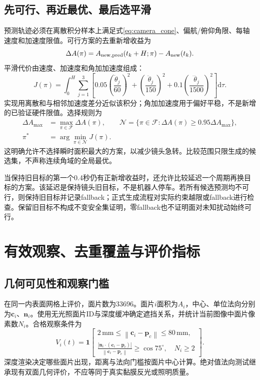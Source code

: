 \documentclass[UTF8,a4paper,zihao=5,fontset=windows]{ctexart}
\newcommand{\vect}[1]{\bm{#1}}
\newcommand{\norm}[1]{\left\lVert#1\right\rVert}
\newcommand{\dd}{\mathrm{d}}
\newcommand{\unit}[1]{\,\mathrm{#1}}
\begin{document}
\subsection{先可行、再近最优、最后选平滑}
预测轨迹必须在离散积分样本上满足式\eqref{eq:camera_cone}、偏航/俯仰角限、每轴速度和加速度限值。可行方案的去重新增收益为
\begin{equation}
\Delta A(\pi)=A_{\rm new,pred}(t_k+H;\pi)-A_{\rm new}(t_k).
\label{eq:predict_gain}
\end{equation}
平滑代价由速度、加速度和角加加速度组成：
\begin{equation}
J(\pi)=\int_0^H\sum_{j=1}^{3}\left[
0.05\left(\frac{\dot\theta_j}{60}\right)^2+\left(\frac{\ddot\theta_j}{150}\right)^2
+0.1\left(\frac{\dddot\theta_j}{1500}\right)^2\right]\dd\tau.
\label{eq:smooth_cost}
\end{equation}
实现用离散和与相邻加速度差分近似该积分；角加加速度用于偏好平稳，不是新增的已验证硬件限值。选择规则为
\begin{align}
\Delta A_{\max}&=\max_{\pi\in\mathcal F}\Delta A(\pi),\qquad
\mathcal N=\{\pi\in\mathcal F:\Delta A(\pi)\ge0.95\Delta A_{\max}\},\\
\pi^*&=\arg\min_{\pi\in\mathcal N}J(\pi).
\label{eq:nearbest}
\end{align}
这明确允许不选择瞬时面积最大的方案，以减少镜头急转。比较范围只限生成的候选集，不声称连续角域的全局最优。

当保持旧目标的第一个0.4秒仍有正新增收益时，还允许比较延迟一个周期再换目标的方案。该延迟是保持镜头旧目标，不是机器人停车。若所有候选预测均不可行，则保持旧目标并记录fallback；正式生成流程对实际约束越限或fallback进行检查。保留旧目标不构成不变安全集证明，零fallback也不证明面对未知扰动始终可行。

\section{有效观察、去重覆盖与评价指标}
\subsection{几何可见性和观察门槛}
在同一内表面网格上评价，面片数为33696。面片$i$面积为$A_i$，中心、单位法向分别为$\vect c_i$、$\vect n_i$。使用无光照面片ID与深度缓冲确定遮挡关系，并统计当前图像中面片像素数$N_i$。合格观察条件为
\begin{equation}
V_i(t)=\mathbf1\left[\begin{gathered}
2\unit{mm}\le\norm{\vect c_i-\vect p_c}\le80\unit{mm},\\
\frac{|\vect n_i\cdot(\vect c_i-\vect p_c)|}{\norm{\vect c_i-\vect p_c}}\ge\cos75^\circ,\quad N_i\ge2
\end{gathered}\right].
\label{eq:quality}
\end{equation}
深度渲染决定哪些面片出现，距离与法向门槛按面片中心计算。绝对值法向测试继承现有双面几何评价，不应等同于真实黏膜反光或照明质量。
\end{document}
